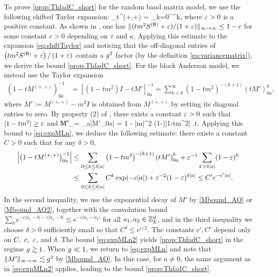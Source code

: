 To prove \eqref{prop:ThfadC_short} for the random band matrix model, we use the following shifted Taylor expansion:
\be\label{eq:shiftTaylor} \Theta_t^{(+,+)} = \sum_{k=0}^\infty {}^k, \ee
where ${\varepsilon}>0$ is a positive constant. As shown in \cite[Lemma 4.2]{bourgade2019random}, one has $\|(tm^2 S^{({\mathsf{B}})} + {\varepsilon})/(1+{\varepsilon})\|_{\infty\to \infty} \le 1-c$ for some constant $c>0$ depending on ${\varepsilon}$ and $\kappa$. Applying this estimate to the expansion \eqref{eq:shiftTaylor} and noticing that the off-diagonal entries of $\left({t m^2 S^{({\mathsf{B}})} + {\varepsilon}}\right)/\left({1+{\varepsilon}}\right)$ contain a $g^2$ factor (by the definition \eqref{eq:variancematrix}), we derive the bound \eqref{prop:ThfadC_short}. For the block Anderson model, we instead use the Taylor expansion %
\begin{align}
\left(1-tM^{(+,+)}\right)^{-1}_{0a} &=\left[\left(1-tm^2\right)I - t M'\right]^{-1}_{0a} = \sum_{k=0}^{\infty}\left(1-tm^2\right)^{-(k+1)}
 \left(t M'\right)^{k}_{0a},\label{eq:expMLn}
\end{align}
where $M':=M^{(+,+)}- m^2I$ is obtained from $M^{(+,+)}$ by setting its diagonal entries to zero.
By property (2) of , there exists a constant ${\varepsilon}>0$ such that $|1-tm^2|\ge {\varepsilon}$ and
\be\label{eq:off_diagM}
\|M'\|_{\infty\to \infty}= \sum_{a}|M'_{0a}| = 1 - |m|^2 \le (1-\e)|1-tm^2| ,\quad \forall t\in[0,1].
\ee
Applying this bound to \eqref{eq:expMLn}, we deduce the following estimate: there exists a constant $C>0$ such that for any $\delta>0$,
\begin{align}
\Big|\big(1-tM^{(+,+)}\big)^{-1}_{0a}\Big| &\le  \sum_{0\le k\le \delta |a|}\left(1-tm^2\right)^{-(k+1)}
 \left(t M'\right)^{k}_{0a} + {\varepsilon}^{-1}\sum_{k> \delta |a|}(1-{\varepsilon})^k \nonumber\\
&\le \sum_{0\le k\le \delta |a|} C^k \exp(-c|a|) +{\varepsilon}^{-2}(1-{\varepsilon})^{\delta|a|} \le C' e^{-c' |a|}.\label{eq:expMLn2}
\end{align}
In the second inequality, we use the exponential decay of $M'$ by \eqref{Mbound_AO} or \eqref{Mbound_AO2}, together with the convolution bound $\sum_{b}e^{-c|a_1-b|-c|a_2-b|}\lesssim e^{-c|a_1-a_2|}$ for all $a_1,a_2\in {\mathbb Z}_L^d$, and in the third inequality we choose $\delta>0$ sufficiently small so that $C^{\delta}\le e^{c/2}$. The constants $c', C'$ depend only on $C,\ c,\ {\varepsilon}$, and $\delta$. The bound \eqref{eq:expMLn2} yields \eqref{prop:ThfadC_short} in the regime $g\gtrsim 1$. When $g\ll 1$, we return to \eqref{eq:expMLn} and note that $\|M'\|_{\infty\to\infty}\lesssim g^2$ by \eqref{Mbound_AO}. In this case, for $a\ne 0$, the same argument as in \eqref{eq:expMLn2} applies, leading to the bound \eqref{prop:ThfadC_short}.


